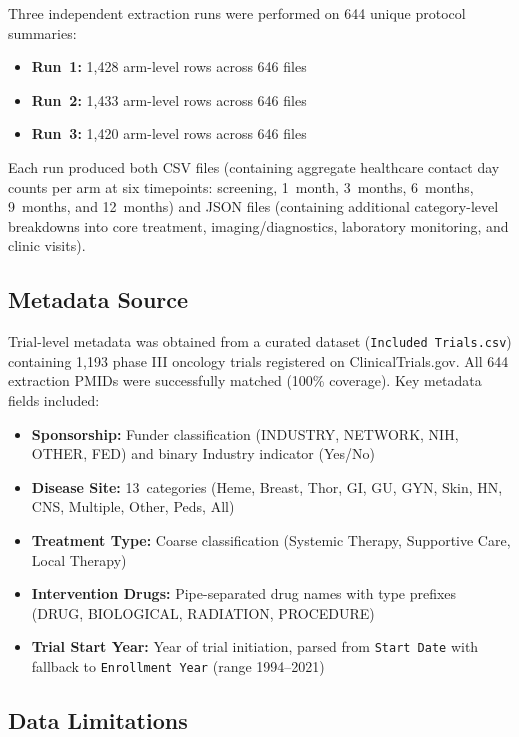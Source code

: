 \documentclass[11pt,a4paper]{article}
\begin{document}
Three independent extraction runs were performed on 644 unique protocol summaries:
\begin{itemize}
    \item \textbf{Run~1:} 1{,}428 arm-level rows across 646 files
    \item \textbf{Run~2:} 1{,}433 arm-level rows across 646 files
    \item \textbf{Run~3:} 1{,}420 arm-level rows across 646 files
\end{itemize}

Each run produced both CSV files (containing aggregate healthcare contact day counts per arm at six timepoints: screening, 1~month, 3~months, 6~months, 9~months, and 12~months) and JSON files (containing additional category-level breakdowns into core treatment, imaging/diagnostics, laboratory monitoring, and clinic visits).

\subsection{Metadata Source}

Trial-level metadata was obtained from a curated dataset (\texttt{Included Trials.csv}) containing 1{,}193 phase III oncology trials registered on ClinicalTrials.gov. All 644 extraction PMIDs were successfully matched (100\% coverage). Key metadata fields included:

\begin{itemize}
    \item \textbf{Sponsorship:} Funder classification (INDUSTRY, NETWORK, NIH, OTHER, FED) and binary Industry indicator (Yes/No)
    \item \textbf{Disease Site:} 13~categories (Heme, Breast, Thor, GI, GU, GYN, Skin, HN, CNS, Multiple, Other, Peds, All)
    \item \textbf{Treatment Type:} Coarse classification (Systemic Therapy, Supportive Care, Local Therapy)
    \item \textbf{Intervention Drugs:} Pipe-separated drug names with type prefixes (DRUG, BIOLOGICAL, RADIATION, PROCEDURE)
    \item \textbf{Trial Start Year:} Year of trial initiation, parsed from \texttt{Start Date} with fallback to \texttt{Enrollment Year} (range 1994--2021)
\end{itemize}

\subsection{Data Limitations}
\end{document}
